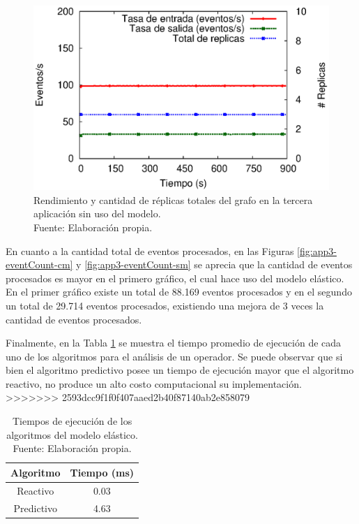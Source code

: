\begin{figure}[!ht]
	\centering
	\captionsetup{justification=centering}
	\includegraphics[scale=0.7]{images/exp/app3/sm/logical/processSystem.eps}
    \caption[Rendimiento y cantidad de r\'eplicas totales del grafo en la tercera aplicaci\'on sin uso del modelo.]{Rendimiento y cantidad de r\'eplicas totales del grafo en la tercera aplicaci\'on sin uso del modelo.\\Fuente: Elaboraci\'on propia.}
	\label{fig:app3-processSystem-sm}
\end{figure}

En cuanto a la cantidad total de eventos procesados, en las Figuras \ref{fig:app3-eventCount-cm} y \ref{fig:app3-eventCount-sm} se aprecia que la cantidad de eventos procesados es mayor en el primero gr\'afico, el cual hace uso del modelo el\'astico. En el primer gr\'afico existe un total de 88.169 eventos procesados y en el segundo un total de 29.714 eventos procesados, existiendo una mejora de 3 veces la cantidad de eventos procesados.


Finalmente, en la Tabla \ref{tab:tiempo-algoritmos} se muestra el tiempo promedio de ejecuci\'on de cada uno de los algoritmos para el an\'alisis de un operador. Se puede observar que si bien el algoritmo predictivo posee un tiempo de ejecuci\'on mayor que el algoritmo reactivo, no produce un alto costo computacional su implementaci\'on.
>>>>>>> 2593dcc9f1f0f407aaed2b40f87140ab2e858079

\newpage
\begin{table}[!ht]
\centering
\captionsetup{justification=centering}
\caption[Tiempos de ejecuci\'on de los algoritmos del modelo el\'astico.]{Tiempos de ejecuci\'on de los algoritmos del modelo el\'astico.\\Fuente: Elaboraci\'on propia.}
\begin{tabular}{| c | c |}
\hline
Algoritmo & Tiempo (ms) \\ \hline
Reactivo & 0.03 \\
Predictivo & 4.63 \\ \hline
\end{tabular}
\label{tab:tiempo-algoritmos}
\end{table}

